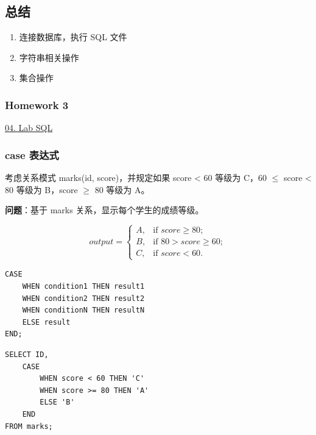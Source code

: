 \documentclass[aspectratio=169, 14pt]{beamer}
\begin{document}


\begin{frame}
    \section{\textcolor{darkmidnightblue}{总结}}   
    \begin{enumerate}
        \item 连接数据库，执行 SQL 文件
        \item 字符串相关操作
        \item 集合操作
    \end{enumerate}

\end{frame}

\begin{frame}
    \frametitle{Homework 3}

    \href{https://github.com/ChenZhongPu/db-swufe/tree/master/04_lab_sql}{04. Lab SQL}

\end{frame}

\begin{frame}
    \frametitle{case 表达式}

    考虑关系模式 marks(id, score)，并规定如果 score < 60 等级为 C，60 $\leq$ score < 80 等级为 B，score $\geq$ 80 等级为 A。

    {\large {}} \textbf{问题}：基于 marks 关系，显示每个学生的成绩等级。
    
\[
output = \begin{cases}
    A, & \text{if $score \geq 80$}; \\
    B, & \text{if $80 > score \geq 60$}; \\
    C, & \text{if $score < 60$}.
\end{cases}
\]
\end{frame}
\begin{frame}[fragile]
    \begin{verbatim}
CASE
    WHEN condition1 THEN result1
    WHEN condition2 THEN result2
    WHEN conditionN THEN resultN
    ELSE result
END;
    \end{verbatim}

    \begin{verbatim}
SELECT ID,
    CASE
        WHEN score < 60 THEN 'C'
        WHEN score >= 80 THEN 'A'
        ELSE 'B'
    END
FROM marks;
    \end{verbatim}

\end{frame}
\end{document}
